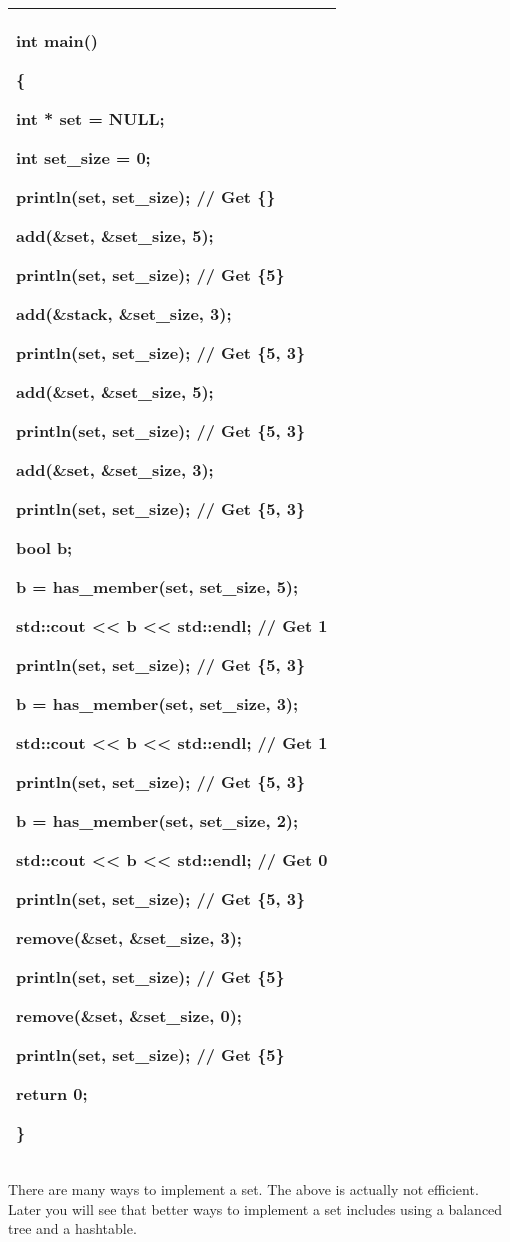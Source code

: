 \documentclass[
]{article}
\begin{document}
\begin{longtable}[]{@{}l@{}}
\toprule
\endhead
\begin{minipage}[t]{0.97\columnwidth}\raggedright
int main()

\{

int * set = NULL;

int set\_size = 0;

println(set, set\_size); // Get \{\}

add(\&set, \&set\_size, 5);

println(set, set\_size); // Get \{5\}

add(\&stack, \&set\_size, 3);

println(set, set\_size); // Get \{5, 3\}

add(\&set, \&set\_size, 5);

println(set, set\_size); // Get \{5, 3\}

add(\&set, \&set\_size, 3);

println(set, set\_size); // Get \{5, 3\}

bool b;

b = has\_member(set, set\_size, 5);

std::cout \textless\textless{} b \textless\textless{} std::endl; // Get
1

println(set, set\_size); // Get \{5, 3\}

b = has\_member(set, set\_size, 3);

std::cout \textless\textless{} b \textless\textless{} std::endl; // Get
1

println(set, set\_size); // Get \{5, 3\}

b = has\_member(set, set\_size, 2);

std::cout \textless\textless{} b \textless\textless{} std::endl; // Get
0

println(set, set\_size); // Get \{5, 3\}

remove(\&set, \&set\_size, 3);

println(set, set\_size); // Get \{5\}

remove(\&set, \&set\_size, 0);

println(set, set\_size); // Get \{5\}

return 0;

\}\strut
\end{minipage}\tabularnewline
\bottomrule
\end{longtable}

There are many ways to implement a set. The above is actually not
efficient. Later you will see that better ways to implement a set
includes using a balanced tree and a hashtable.
\end{document}

